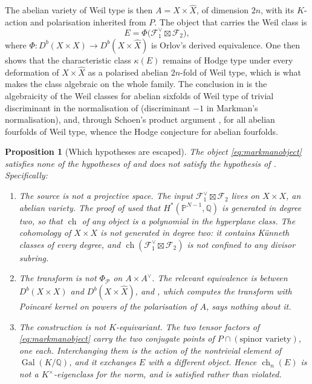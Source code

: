 \documentclass[11pt,reqno]{amsart}
\theoremstyle{plain}
\newtheorem{proposition}[theorem]{Proposition}
\theoremstyle{definition}
\theoremstyle{remark}
\newcommand{\QQ}{\mathbb{Q}}
\newcommand{\PP}{\mathbb{P}}
\newcommand{\Av}{A^{\vee}}
\newcommand{\cP}{\mathcal{P}}
\newcommand{\cF}{\mathcal{F}}
\DeclareMathOperator{\ch}{ch}
\DeclareMathOperator{\Gal}{Gal}
\newcommand{\Kx}{K^{\times}}
\begin{document}
The abelian variety of Weil type is then $A=X\times\widehat{X}$, of dimension
$2n$, with its $K$-action and polarisation inherited from $P$. The object that
carries the Weil class is
\begin{equation}\label{eq:markmanobject}
  E=\Phi\bigl(\cF_{1}^{\vee}\boxtimes\cF_{2}\bigr),
\end{equation}
where $\Phi\colon D^{b}(X\times X)\to D^{b}(X\times\widehat{X})$ is Orlov's
derived equivalence. One then shows that the characteristic class $\kappa(E)$
remains of Hodge type under every deformation of $X\times\widehat{X}$ as a
polarised abelian $2n$-fold of Weil type, which is what makes the class
algebraic on the whole family. The conclusion in \cite{Mar25b} is the
algebraicity of the Weil classes for abelian sixfolds of Weil type of trivial
discriminant in the normalisation of  (discriminant $-1$ in
Markman's normalisation), and, through Schoen's product argument
\cite[Proposition~10]{Sch98}, for all abelian fourfolds of Weil type, whence
the Hodge conjecture for abelian fourfolds.

\begin{proposition}[Which hypotheses are escaped]\label{prop:whichescaped}
The object \eqref{eq:markmanobject} satisfies none of the hypotheses of
 and does not satisfy the hypothesis of
. Specifically:
\begin{enumerate}[label=\textup{(\roman*)}]
\item \emph{The source is not a projective space.} The input
  $\cF_{1}^{\vee}\boxtimes\cF_{2}$ lives on $X\times X$, an abelian variety.
  The proof of  used that $H^{*}(\PP^{N-1},\QQ)$ is generated
  in degree two, so that $\ch$ of any object is a polynomial in the hyperplane
  class. The cohomology of $X\times X$ is not generated in degree two: it
  contains K\"unneth classes of every degree, and $\ch(\cF_{1}^{\vee}\boxtimes\cF_{2})$
  is not confined to any divisor subring.
\item \emph{The transform is not $\Phi_{\cP}$ on $A\times\Av$.} The relevant
  equivalence is between $D^{b}(X\times X)$ and $D^{b}(X\times\widehat{X})$,
  and , which computes the transform with Poincar\'e kernel
  on powers of the polarisation of $A$, says nothing about it.
\item \emph{The construction is not $K$-equivariant.} The two tensor factors
  of \eqref{eq:markmanobject} carry the two conjugate points of
  $P\cap(\text{spinor variety})$, one each. Interchanging them is the action of
  the nontrivial element of $\Gal(K/\QQ)$, and it exchanges $E$ with a
  different object. Hence $\ch_{n}(E)$ is not a $\Kx$-eigenclass for the norm,
  and  is satisfied rather than violated.
\end{enumerate}
\end{proposition}
\end{document}
